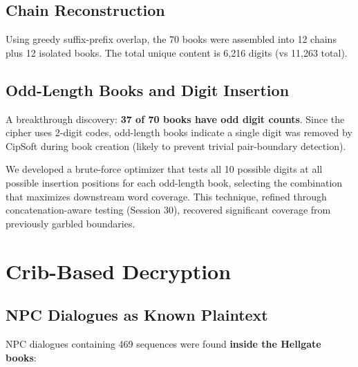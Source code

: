 \documentclass[11pt,a4paper]{article}
\begin{document}
\subsection{Chain Reconstruction}

Using greedy suffix-prefix overlap, the 70 books were assembled into 12 chains plus 12 isolated books. The total unique content is 6,216 digits (vs 11,263 total).

\subsection{Odd-Length Books and Digit Insertion}

A breakthrough discovery: \textbf{37 of 70 books have odd digit counts}. Since the cipher uses 2-digit codes, odd-length books indicate a single digit was removed by CipSoft during book creation (likely to prevent trivial pair-boundary detection).

We developed a brute-force optimizer that tests all 10 possible digits at all possible insertion positions for each odd-length book, selecting the combination that maximizes downstream word coverage. This technique, refined through concatenation-aware testing (Session 30), recovered significant coverage from previously garbled boundaries.

\section{Crib-Based Decryption}

\subsection{NPC Dialogues as Known Plaintext}

NPC dialogues containing 469 sequences were found \textbf{inside the Hellgate books}:

\begin{table}[h]
\centering
{}
\end{table}
\end{document}
